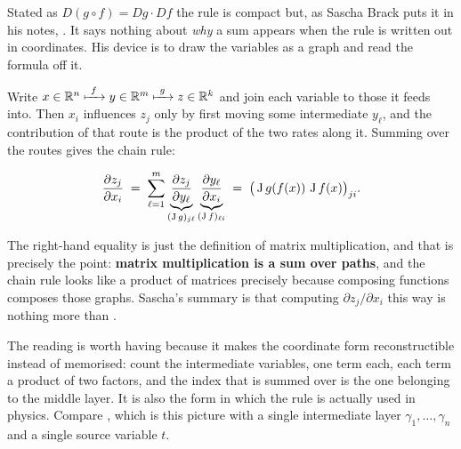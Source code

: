 \begin{remark}
\label{rem:chain_rule_paths}
Stated as $D(g\circ f) = Dg\cdot Df$ the rule is compact but, as Sascha Brack puts it in his
notes, . It says nothing about \emph{why} a sum appears when the rule is
written out in coordinates. His device is to draw the variables as a graph and read the formula
off it.

Write $x \in \mathbb{R}^n \xmapsto{\ f\ } y \in \mathbb{R}^m \xmapsto{\ g\ } z \in \mathbb{R}^k$
and join each variable to those it feeds into. Then $x_i$ influences $z_j$ only by first moving
some intermediate $y_\ell$, and the contribution of that route is the product of the two rates
along it. Summing over the routes gives the chain rule:

\begin{center}
\end{center}

\[\frac{\partial z_j}{\partial x_i}
  \;=\; \sum_{\ell=1}^{m}
  \underbrace{\frac{\partial z_j}{\partial y_\ell}}_{(\operatorname{J} g)_{j\ell}}
  \underbrace{\frac{\partial y_\ell}{\partial x_i}}_{(\operatorname{J} f)_{\ell i}}
  \;=\; \big(\operatorname{J} g(f(x))\,\operatorname{J} f(x)\big)_{ji}.\]

The right-hand equality is just the definition of matrix multiplication, and that is precisely the
point: \textbf{matrix multiplication is a sum over paths}, and the chain rule looks like a product of
matrices precisely because composing functions composes those graphs. Sascha's summary is that
computing $\partial z_j/\partial x_i$ this way is nothing more than .

The reading is worth having because it makes the coordinate form reconstructible instead of
memorised: count the intermediate variables, one term each, each term a product of two factors,
and the index that is summed over is the one belonging to the middle layer. It is also the
form in which the rule is actually used in physics. Compare
, which is this picture with a single intermediate layer
$\gamma_1,\dots,\gamma_n$ and a single source variable $t$.
\end{remark}

